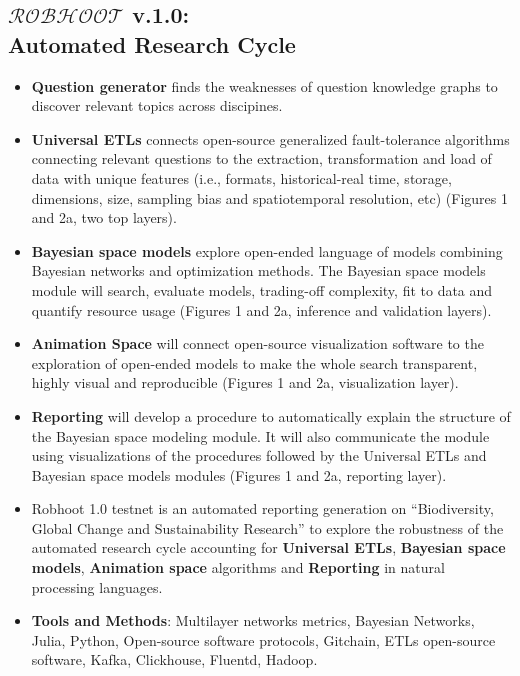 \documentclass[10pt, a4paper, twocolumn]{article} %
\begin{document}
  \subsection{{\bf $\mathcal{ROBHOOT}$ v.1.0}: \\Automated Research Cycle}
  \begin{itemize}
  \item {\bf Question generator} finds the weaknesses of question
    knowledge graphs to discover relevant topics across discipines.
  \item {\bf Universal ETLs} connects open-source generalized
    fault-tolerance algorithms connecting relevant questions to the
    extraction, transformation and load of data with unique features
    (i.e., formats, historical-real time, storage, dimensions, size,
    sampling bias and spatiotemporal resolution, etc) (Figures 1 and
    2a, two top layers).
   \item {\bf Bayesian space models} explore open-ended language of
     models combining Bayesian networks and optimization methods. The
     Bayesian space models module will search, evaluate models,
     trading-off complexity, fit to data and quantify resource usage
     (Figures 1 and 2a, inference and validation layers). 
   \item {\bf Animation Space} will connect open-source visualization
     software to the exploration of open-ended models to make the
     whole search transparent, highly visual and reproducible (Figures
     1 and 2a, visualization layer).
   \item {\bf Reporting} will develop a procedure to automatically
     explain the structure of the Bayesian space modeling module. It
     will also communicate the module using visualizations of the
     procedures followed by the Universal ETLs and Bayesian space
     models modules (Figures 1 and 2a, reporting layer).
   \item Robhoot 1.0 testnet is an automated reporting generation on
     ``Biodiversity, Global Change and Sustainability Research'' to
     explore the robustness of the automated research cycle accounting
     for {\bf Universal ETLs}, {\bf Bayesian space models}, {\bf
       Animation space} algorithms and {\bf Reporting} in natural
     processing languages.
   \end{itemize}

   \begin{itemize}
   \item {\bf Tools and Methods}: Multilayer networks metrics,
     Bayesian Networks, Julia, Python, Open-source software protocols,
     Gitchain, ETLs open-source software, Kafka, Clickhouse, Fluentd,
     Hadoop.
   \end{itemize}
\end{document}
